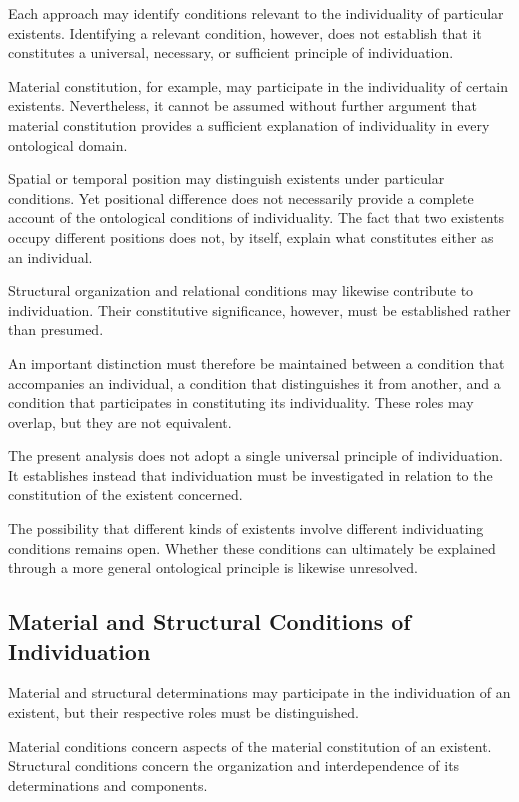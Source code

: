 Each approach may identify conditions relevant to the
individuality of particular existents. Identifying a relevant
condition, however, does not establish that it constitutes
a universal, necessary, or sufficient principle of individuation.

Material constitution, for example, may participate in the
individuality of certain existents. Nevertheless, it cannot
be assumed without further argument that material constitution
provides a sufficient explanation of individuality in every
ontological domain.

Spatial or temporal position may distinguish existents under
particular conditions. Yet positional difference does not
necessarily provide a complete account of the ontological
conditions of individuality. The fact that two existents
occupy different positions does not, by itself, explain
what constitutes either as an individual.

Structural organization and relational conditions may likewise
contribute to individuation. Their constitutive significance,
however, must be established rather than presumed.

An important distinction must therefore be maintained between
a condition that accompanies an individual, a condition that
distinguishes it from another, and a condition that participates
in constituting its individuality. These roles may overlap,
but they are not equivalent.

The present analysis does not adopt a single universal principle
of individuation. It establishes instead that individuation
must be investigated in relation to the constitution of the
existent concerned.

The possibility that different kinds of existents involve
different individuating conditions remains open. Whether
these conditions can ultimately be explained through a more
general ontological principle is likewise unresolved.

\subsection{Material and Structural Conditions of Individuation}

Material and structural determinations may participate in
the individuation of an existent, but their respective roles
must be distinguished.

Material conditions concern aspects of the material
constitution of an existent. Structural conditions concern
the organization and interdependence of its determinations
and components.

